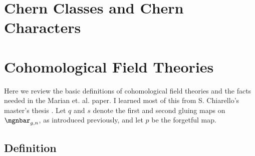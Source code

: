 \documentclass[raggedright, nofonts, notitlepage, openany, debug]{tufte-book}
\begin{document}
\section{Chern Classes and Chern Characters}
\section{Cohomological Field Theories}
Here we review the basic definitions of cohomological field theories and the facts needed in the Marian et. al. paper. I learned most of this from S. Chiarello's master's thesis \cite{chiarello2016telemans}. Let $q$ and $s$ denote the first and second gluing maps on $\mgnbar_{g,n}$, as introduced previously, and let $p$ be the forgetful map.

\subsection{Definition}
\end{document}
